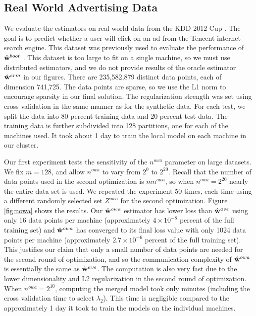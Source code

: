 \documentclass[thesis.tex]{subfiles}
\newcommand{\Zowa}{Z^{\textit{owa}}}
\newcommand{\nowa}{n^{\textit{owa}}}
\begin{document}
\vspace{-0.1in}
\subsection{Real World Advertising Data}

\vspace{-0.05in}
We evaluate the estimators on real world data from the KDD 2012 Cup \citep{kddcup2012}.
The goal is to predict whether a user will click on an ad from the Tencent internet search engine.
This dataset was previously used to evaluate the performance of $\hat{\mathbf w}^{boot}$ \citep{zhang2012communication}.
This dataset is too large to fit on a single machine,
so we must use distributed estimators,
and we do not provide results of the oracle estimator $\hat{\mathbf w}^{erm}$ in our figures.
There are 235,582,879 distinct data points,
each of dimension 741,725.
The data points are sparse, so we use the L1 norm to encourage sparsity in our final solution.
The regularization strength was set using cross validation in the same manner as for the synthetic data.
For each test, we split the data into 80 percent training data and 20 percent test data.
The training data is further subdivided into 128 partitions,
one for each of the machines used.
It took about 1 day to train the local model on each machine in our cluster.

Our first experiment tests the sensitivity of the $\nowa$ parameter on large datasets.
We fix $m=128$, and allow $\nowa$ to vary from $2^0$ to $2^{20}$.
Recall that the number of data points used in the second optimization is $m\nowa$,
so when $\nowa=2^{20}$ nearly the entire data set is used.
We repeated the experiment 50 times, each time using a different randomly selected set $\Zowa$ for the second optimization.
Figure \ref{fig:nowa} shows the results.
Our $\hat{\mathbf w}^{owa}$ estimator has lower loss than $\hat{\mathbf w}^{ave}$ using only 16 data points per machine (approximately $4\times10^{-8}$ percent of the full training set)
and $\hat{\mathbf w}^{owa}$ has converged to its final loss value with only 1024 data points per machine (approximately $2.7\times10^{-6}$ percent of the full training set).
This justifies our claim that only a small number of data points are needed for the second round of optimization,
and so the communication complexity of $\hat{\mathbf w}^{owa}$ is essentially the same as $\hat{\mathbf w}^{ave}$.
The computation is also very fast due to the lower dimensionality and L2 regularization in the second round of optimization.
When $\nowa=2^{10}$, computing the merged model took only minutes 
(including the cross validation time to select $\lambda_2$).
This time is negligible compared to the approximately 1 day it took to train the models on the individual machines. 
\end{document}
